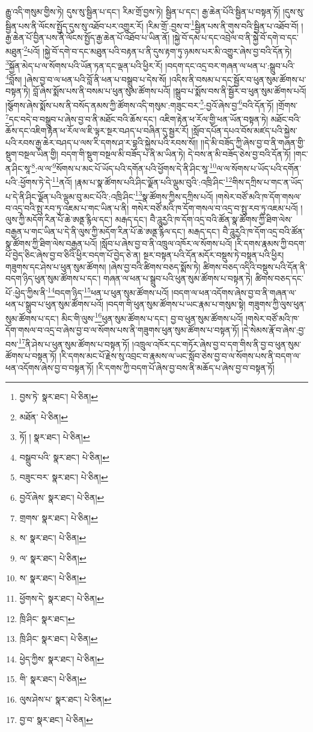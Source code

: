 རྒྱུ་འདི་གསུམ་གྱིས་ཏེ། དུས་སུ་སྦྱིན་པ་དང་། རིམ་གྲོ་བྱས་ཏེ། སྦྱིན་པ་དང་། རྒྱ་ཆེན་པོའི་སྦྱིན་པ་བསྟན་ཏོ། །དུས་སུ་སྦྱིན་པས་ནི་ལོངས་སྤྱོད་དུས་སུ་འཐོབ་པར་འགྱུར་རོ། །རིམ་གྲོ་:བྱས་བ་\footnote{བྱས་ཏེ་  སྣར་ཐང་།  པེ་ཅིན། }སྦྱིན་པས་ནི་གུས་བའི་སྦྱིན་པ་འཐོབ་བོ། །རྒྱ་ཆེན་པོ་བྱིན་པས་ནི་ལོངས་སྤྱོད་རྒྱ་ཆེན་པོ་འཐོབ་པ་ཡིན་ནོ། །སྐྱེ་བོ་དམ་པ་དང་འབྲེལ་བ་ནི་སྐྱེ་བོ་དགེ་བ་དང་མཐུན་\footnote{མཐོན་  པེ་ཅིན། }པའོ། །སྐྱེ་བོ་དགེ་བ་དང་མཐུན་པའི་བརྟན་པ་ནི་དུས་རྟག་ཏུ་ཉམས་པར་མི་འགྱུར་ཞེས་བྱ་བའི་དོན་ཏེ། \footnote{ཏོ། །   སྣར་ཐང་།  པེ་ཅིན། }སྐྱོན་མེད་པ་ལ་སོགས་པའི་ཡོན་ཏན་དང་ལྡན་པའི་ཕྱིར་རོ། །བདག་དང་འདྲ་བར་གཞན་ལ་ཕན་པ་:སྒྲུབ་པའི་\footnote{བསྒྲུབ་པའི་  སྣར་ཐང་།  པེ་ཅིན། }བློས། །ཞེས་བྱ་བ་ལ་ཕན་པའི་བློ་ནི་ཕན་པ་བསྒྲུབ་པ་དེས་སོ། །འདིས་ནི་བསམ་པ་དང་སྦྱོར་བ་ཕུན་སུམ་ཚོགས་པ་བསྟན་ཏེ། བློ་ཞེས་སྨོས་པས་ནི་བསམ་པ་ཕུན་སུམ་ཚོགས་པའོ། །སྒྲུབ་པ་སྨོས་བས་ནི་སྦྱོར་བ་ཕུན་སུམ་ཚོགས་པའོ། །སྩོགས་ཞེས་སྨོས་པས་ནི་བསོད་ནམས་ཀྱི་ཚོགས་འདི་གསུམ་:གཟུང་བར་\footnote{བཟུང་བར་  སྣར་ཐང་།  པེ་ཅིན། }:བྱའོ་ཞེས་བྱ་\footnote{བྱའོ་ཞེས་  སྣར་ཐང་།  པེ་ཅིན། }བའི་དོན་ཏོ། །གྲོགས་\footnote{གྲགས་  སྣར་ཐང་།  པེ་ཅིན། }དང་བདེ་བ་བསྒྲུབ་པ་ཞེས་བྱ་བ་ནི་མཐོང་བའི་ཆོས་དང་། འཇིག་རྟེན་ཕ་རོལ་གྱི་ཕན་ཡོན་བསྟན་ཏེ། མཐོང་བའི་ཆོས་དང་འཇིག་རྟེན་ཕ་རོལ་ལ་ཇི་ལྟར་སྔར་བཤད་པ་བཞིན་དུ་སྦྱར་རོ། །སློབ་དཔོན་དཔའ་བོས་མཛད་པའི་སྐྱེས་པའི་རབས་རྒྱ་ཆེར་བཤད་པ་ལས་རི་དགས་ཤ་ར་བྷའི་སྐྱེས་པའི་རབས་སོ།། །།དེ་མི་བཟོད་ཀྱི་ཞེས་བྱ་བ་ནི་གཞན་གྱི་སྡུག་བསྔལ་ཡིན་གྱི། བདག་གི་སྡུག་བསྔལ་མི་བཟོད་པ་ནི་མ་ཡིན་ཏེ། དེ་བས་ན་མི་བཟོད་ཅེས་བྱ་བའི་དོན་ཏོ། །གང་ན་ཤིང་སཱ་\footnote{ས་  སྣར་ཐང་།  པེ་ཅིན། }:ལ་ལ་\footnote{ལ་  སྣར་ཐང་།  པེ་ཅིན། }སོགས་པ་མང་པོ་ཡོད་པའི་དགོན་པའི་ཕྱོགས་དེ་ནི་ཤིང་སཱ་\footnote{ས་  སྣར་ཐང་།  པེ་ཅིན། }ལ་ལ་སོགས་པ་ཡོད་པའི་དགོན་པའི་:ཕྱོགས་ཏེ་དེ་\footnote{ཕྱོགས་དེ་  སྣར་ཐང་།  པེ་ཅིན། }ནའོ། །རྣམ་པ་སྣ་ཚོགས་པའི་ཤིང་ལྗོན་པའི་ལྡུམ་བུའི་:འཁྲི་ཤིང་\footnote{ཁྲི་ཤིང་  སྣར་ཐང་། }གིས་དཀྲིས་པ་གང་ན་ཡོད་པ་དེ་ནི་ཤིང་ལྗོན་པའི་ལྡུམ་བུ་མང་པོའི་:འཁྲི་ཤིང་\footnote{ཁྲི་ཤིང་  སྣར་ཐང་།  པེ་ཅིན། }སྣ་ཚོགས་ཀྱིས་དཀྲིས་པའོ། །གསེར་བཙོ་མའི་ཁ་དོག་གསལ་བ་འདྲ་བའི་སྤུ་རབ་ཏུ་འཇམ་པ་གང་ཡིན་པ་ནི། གསེར་བཙོ་མའི་ཁ་དོག་གསལ་བ་འདྲ་བ་སྤུ་རབ་ཏུ་འཇམ་པའོ། །ལུས་ཀྱི་མདོག་རིན་པོ་ཆེ་ཨནྡ་རྙིལ་དང་། མརྒད་དང་། བཻ་ཌཱུརྱའི་ཁ་དོག་འདྲ་བའི་ཚོན་སྣ་ཚོགས་ཀྱི་ཐིག་ལེས་བརྒྱན་པ་གང་ཡིན་པ་དེ་ནི་ལུས་ཀྱི་མདོག་རིན་པོ་ཆེ་ཨནྡ་རྙིལ་དང་། མརྒད་དང་། བཻ་ཌཱུརྱའི་ཁ་དོག་འདྲ་བའི་ཚོན་སྣ་ཚོགས་ཀྱི་ཐིག་ལེས་བརྒྱན་པའོ། །སློབ་པ་ཞེས་བྱ་བ་ནི་འཁྲུལ་འཁོར་ལ་སོགས་པའོ། །རི་དགས་རྣམས་ཀྱི་བདག་པོ་བྱེད་ཅིང་ཞེས་བྱ་བ་ཅིའི་ཕྱིར་བདག་པོ་བྱེད་ཅེ་ན། སྔར་བསྟན་པའི་དོན་མདོར་བསྡུས་ཏེ་བསྟན་པའི་ཕྱིར། གཟུགས་དང་ཤེས་པ་ཕུན་སུམ་ཚོགས། །ཞེས་བྱ་བའི་ཚིགས་བཅད་སྨོས་ཏེ། ཚིགས་བཅད་འདིའི་བསྡུས་པའི་དོན་ནི་བདག་ཉིད་ཕུན་སུམ་ཚོགས་པ་དང་། གཞན་ལ་ཕན་པ་སྒྲུབ་པའི་ཕུན་སུམ་ཚོགས་པ་བསྟན་ཏེ། ཚིགས་བཅད་དང་པོ་:ཕྱེད་ཀྱིས་ནི་\footnote{ཕྱེད་ཀྱིས་  སྣར་ཐང་།  པེ་ཅིན། }བདག་ཉིད་\footnote{གི་  སྣར་ཐང་།  པེ་ཅིན། }ཕན་པ་ཕུན་སུམ་ཚོགས་པའོ། །བདག་ལ་ཕན་འདོགས་ཞེས་བྱ་བ་ནི་གཞན་ལ་ཕན་པ་སྒྲུབ་པ་ཕུན་སུམ་ཚོགས་པའོ། །བདག་གི་ཕུན་སུམ་ཚོགས་པ་ཡང་རྣམ་པ་གསུམ་སྟེ། གཟུགས་ཀྱི་ལུས་ཕུན་སུམ་ཚོགས་པ་དང་། མིང་གི་ལུས་\footnote{ལུས་ཤེས་པ་  སྣར་ཐང་།  པེ་ཅིན། }ཕུན་སུམ་ཚོགས་པ་དང་། བྱ་བ་ཕུན་སུམ་ཚོགས་པའོ། །གསེར་བཙོ་མའི་ཁ་དོག་གསལ་བ་འདྲ་བ་ཞེས་བྱ་བ་ལ་སོགས་པས་ནི་གཟུགས་ཕུན་སུམ་ཚོགས་པ་བསྟན་ཏོ། །དེ་སེམས་རྣོ་བ་ཞེས་:བྱ་བས་\footnote{བྱ་བ་  སྣར་ཐང་།  པེ་ཅིན། }ནི་ཤེས་པ་ཕུན་སུམ་ཚོགས་པ་བསྟན་ཏོ། །འཁྲུལ་འཁོར་དང་གཏོར་ཞེས་བྱ་བ་དག་གིས་ནི་བྱ་བ་ཕུན་སུམ་ཚོགས་པ་བསྟན་ཏོ། །རི་དགས་མང་པོ་རྗེས་སུ་འབྲང་བ་རྣམས་ལ་ཡང་སློབ་ཅེས་བྱ་བ་ལ་སོགས་པས་ནི་བདག་ལ་ཕན་འདོགས་ཞེས་བྱ་བ་བསྟན་ཏོ། །རི་དགས་ཀྱི་བདག་པོ་ཞེས་བྱ་བས་ནི་མཆོད་པ་ཞེས་བྱ་བ་བསྟན་ཏོ། 